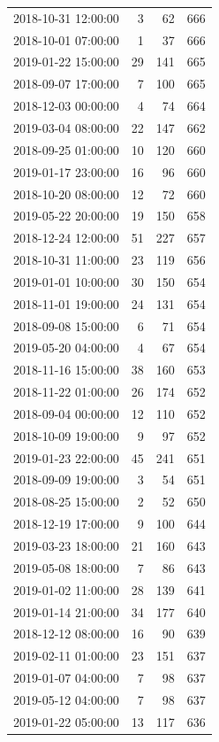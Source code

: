 \begin{tabular}{lrrr}
2018-10-31 12:00:00 & 3 & 62 & 666 \\
2018-10-01 07:00:00 & 1 & 37 & 666 \\
2019-01-22 15:00:00 & 29 & 141 & 665 \\
2018-09-07 17:00:00 & 7 & 100 & 665 \\
2018-12-03 00:00:00 & 4 & 74 & 664 \\
2019-03-04 08:00:00 & 22 & 147 & 662 \\
2018-09-25 01:00:00 & 10 & 120 & 660 \\
2019-01-17 23:00:00 & 16 & 96 & 660 \\
2018-10-20 08:00:00 & 12 & 72 & 660 \\
2019-05-22 20:00:00 & 19 & 150 & 658 \\
2018-12-24 12:00:00 & 51 & 227 & 657 \\
2018-10-31 11:00:00 & 23 & 119 & 656 \\
2019-01-01 10:00:00 & 30 & 150 & 654 \\
2018-11-01 19:00:00 & 24 & 131 & 654 \\
2018-09-08 15:00:00 & 6 & 71 & 654 \\
2019-05-20 04:00:00 & 4 & 67 & 654 \\
2018-11-16 15:00:00 & 38 & 160 & 653 \\
2018-11-22 01:00:00 & 26 & 174 & 652 \\
2018-09-04 00:00:00 & 12 & 110 & 652 \\
2018-10-09 19:00:00 & 9 & 97 & 652 \\
2019-01-23 22:00:00 & 45 & 241 & 651 \\
2018-09-09 19:00:00 & 3 & 54 & 651 \\
2018-08-25 15:00:00 & 2 & 52 & 650 \\
2018-12-19 17:00:00 & 9 & 100 & 644 \\
2019-03-23 18:00:00 & 21 & 160 & 643 \\
2019-05-08 18:00:00 & 7 & 86 & 643 \\
2019-01-02 11:00:00 & 28 & 139 & 641 \\
2019-01-14 21:00:00 & 34 & 177 & 640 \\
2018-12-12 08:00:00 & 16 & 90 & 639 \\
2019-02-11 01:00:00 & 23 & 151 & 637 \\
2019-01-07 04:00:00 & 7 & 98 & 637 \\
2019-05-12 04:00:00 & 7 & 98 & 637 \\
2019-01-22 05:00:00 & 13 & 117 & 636 \\

\end{tabular}
